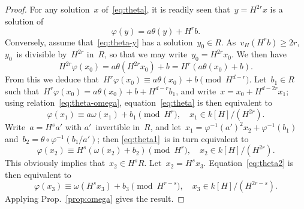 \documentclass{llncs}
\begin{document}
\begin{proof}
For any solution~$x$ of~\eqref{eq:theta}, it is readily seen that~$y =
H^{2r} x$ is a solution of
\begin{equation}\label{eq:theta-y}
φ(y) = a θ(y) + H^r b.
\end{equation}
Conversely, assume that~\eqref{eq:theta-y} has a solution~$y_0 ∈ R$.
As~$v_H(H^r b) ≥ 2r$, $y_0$~is divisible by~$H^{2r}$ in~$R$, so that we
may write~$y_0 = H^{2r} x_0$. We then have
\begin{equation}
H^{2r} φ(x_0) = a θ(H^{2r} x_0) + b = H^r (a θ(x_0) + b).
\end{equation}
From this we deduce that~$H^r φ(x_0) ≡ a θ(x_0) + b \pmod{H^{d-r}}$.
Let~$b_1 ∈ R$ such that~$H^r φ(x_0) = a θ(x_0) + b + H^{d-r} b_1$, and
write~$x = x_0 + H^{d-2r} x_1$; using relation~\ref{eq:theta-omega},
equation~\ref{eq:theta} is then equivalent to
\begin{equation}\label{eq:theta1}
φ (x_1) ≡ a ω(x_1) + b_1 \pmod{H^r}, \quad x_1 ∈ k[H]/(H^{2r}).
\end{equation}
Write~$a = H^s a'$ with $a'$~invertible in~$R$, and let~$x_1 =
φ^{-1}(a')^2 x_2 + φ^{-1} (b_1)$ and~$b_2 = θ ∘ φ^{-1}(b_1/a')$; then
\eqref{eq:theta1}~is in turn equivalent to
\begin{equation}\label{eq:theta2}
φ (x_2) ≡ H^s (ω(x_2) + b_2) \pmod{H^r}, \quad x_2 ∈ k[H]/(H^{2r}).
\end{equation}
This obviously implies that~$x_2 ∈ H^s R$. Let~$x_2 = H^s x_3$.
Equation~\eqref{eq:theta2} is then equivalent to
\begin{equation}\label{eq:theta3}
φ (x_3) ≡ ω(H^s x_3) + b_3 \pmod{H^{r-s}},
  \quad x_3 ∈ k[H]/(H^{2r-s}).
\end{equation}
Applying Prop.~\ref{prop:omega} gives the result.
\end{proof}
\end{document}
